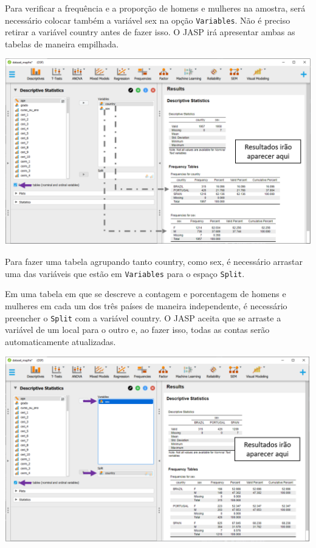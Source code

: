 \documentclass[
]{book}
\begin{document}
Para verificar a frequência e a proporção de homens e mulheres na amostra, será necessário colocar também a variável sex na opção \texttt{Variables}. Não é preciso retirar a variável country antes de fazer isso. O JASP irá apresentar ambas as tabelas de maneira empilhada.

\includegraphics{./img/cap_desc_jasp_proporcao_duas_variaveis.png}

Para fazer uma tabela agrupando tanto country, como sex, é necessário arrastar uma das variáveis que estão em \texttt{Variables} para o espaço \texttt{Split}.

Em uma tabela em que se descreve a contagem e porcentagem de homens e mulheres em cada um dos três países de maneira independente, é necessário preencher o \texttt{Split} com a variável country. O JASP aceita que se arraste a variável de um local para o outro e, ao fazer isso, todas as contas serão automaticamente atualizadas.

\includegraphics{./img/cap_desc_jasp_proporcao_duas_variaveis_split.png}
\end{document}
